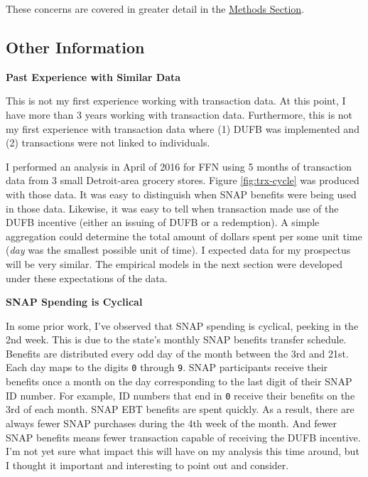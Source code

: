 \documentclass[12pt,letterpaperpaper,]{book}
\begin{document}
These concerns are covered in greater detail in the
\protect\hyperlink{methods-1}{Methods Section}.

\subsection*{Other Information}\label{other-information}

\textbf{Past Experience with Similar Data}

This is not my first experience working with transaction data. At this
point, I have more than 3 years working with transaction data.
Furthermore, this is not my first experience with transaction data where
(1) DUFB was implemented and (2) transactions were not linked to
individuals.

I performed an analysis in April of 2016 for FFN using 5 months of
transaction data from 3 small Detroit-area grocery stores. Figure
\ref{fig:trx-cycle} was produced with those data. It was easy to
distinguish when SNAP benefits were being used in those data. Likewise,
it was easy to tell when transaction made use of the DUFB incentive
(either an issuing of DUFB or a redemption). A simple aggregation could
determine the total amount of dollars spent per some unit time
(\emph{day} was the smallest possible unit of time). I expected data for
my prospectus will be very similar. The empirical models in the next
section were developed under these expectations of the data.

\textbf{SNAP Spending is Cyclical}

In some prior work, I've observed that SNAP spending is cyclical,
peeking in the 2nd week. This is due to the state's monthly SNAP
benefits transfer schedule. Benefits are distributed every odd day of
the month between the 3rd and 21st. Each day maps to the digits
\texttt{0} through \texttt{9}. SNAP participants receive their benefits
once a month on the day corresponding to the last digit of their SNAP ID
number. For example, ID numbers that end in \texttt{0} receive their
benefits on the 3rd of each month. SNAP EBT benefits are spent quickly.
As a result, there are always fewer SNAP purchases during the 4th week
of the month. And fewer SNAP benefits means fewer transaction capable of
receiving the DUFB incentive. I'm not yet sure what impact this will
have on my analysis this time around, but I thought it important and
interesting to point out and consider.
\end{document}
